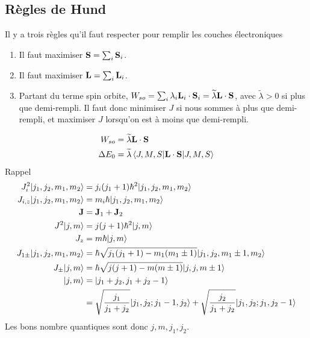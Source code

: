 
\subsection{Règles de Hund} %
\label{sub:Règle de Hund}

Il y a trois règles qu'il faut respecter pour remplir les couches électroniques
\begin{enumerate}
    \item Il faut maximiser $\vb{S}=\sum_i\vb{S}_i$.
    \item Il faut maximiser $\vb{L}=\sum_i\vb{L}_i$.
    \item Partant du terme spin orbite, $W_{so}=\sum_i\lambda_i\vb{L}_i\cdot\vb{S}_i
        =\widetilde{\lambda}\vb{L}\cdot\vb{S}$, avec $\widetilde{\lambda}>0$ si
        plus que demi-rempli. Il faut donc minimiser $J$ si nous sommes à plus
        que demi-rempli, et maximiser $J$ lorsqu'on est à moins que demi-rempli.
\end{enumerate}
\begin{align}
    W_{so}&=\widetilde{\lambda}\vb{L}\cdot\vb{S}\\
    \Delta E_0&=\widetilde{\lambda}\expval{
    J,M,S|\vb{L}\cdot\vb{S}|J,M,S}
\end{align}
Rappel
\begin{align}
    J_i^2|{j_1,j_2,m_1,m_2}\rangle&=j_i(j_1+1)\hbar^2|{j_1,j_2,m_1,m_2}\rangle\\
    J_{i,z}|{j_1,j_2,m_1,m_2}\rangle&=m_i\hbar|{j_1,j_2,m_1,m_2}\rangle\\
    \vb{J}&=\vb{J}_1+\vb{J}_2\\
    J^2|{j,m}\rangle&=j(j+1)\hbar^2|{j,m}\rangle\\
    J_z&=m\hbar|{j,m}\rangle\\
    J_{1\pm}|{j_1,j_2,m_1,m_2}\rangle&=\hbar\sqrt{j_1(j_1+1)-m_1(m_1\pm1)}
    |{j_1,j_2,m_1\pm1,m_2}\rangle\\
    J_{\pm}|{j,m}\rangle&=\hbar\sqrt{j(j+1)-m(m\pm1)}
    |{j,j,m\pm1}\rangle\\
    |{j,m}\rangle&=|{j_1+j_2,j_1+j_2-1}\rangle\\
             &=\sqrt{\frac{j_1}{j_1+j_2}}|{j_1,j_2;j_1-1,j_2}\rangle
             +\sqrt{\frac{j_2}{j_1+j_2}}|{j_1,j_2;j_1,j_2-1}\rangle
\end{align}
Les bons nombre quantiques sont donc $j, m,j_1,j_2$.




